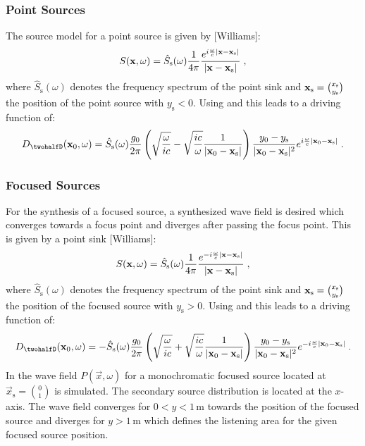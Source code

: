 \documentclass{article}
\begin{document}
\subsubsection{Point Sources}
The source model for a point source is given by [Williams]:
\begin{equation} 
    S(  \mathbf{x}  ,\omega) = 
    \hat{S}_\text{s}(\omega)
    \frac{1}{4\pi} \frac{e^{i\frac{\omega}{c}|  \mathbf{x}  -  \mathbf{x}  _\text{s}|}}{|  \mathbf{x}  -  \mathbf{x}  _\text{s}|}
    \;, 
\end{equation}
where $\hat{S}_\text{s}(\omega)$ denotes the frequency spectrum of the point
sink and $  \mathbf{x}  _\text{s} = \binom{x_\text{s}}{y_\text{s}}$ the position of the
point source with $y_\text{s} < 0$.
Using  and  this leads to a driving function of:
\begin{equation}
    D_\twohalfD(\x_0,\omega) = \hat{S}_\text{s}(\omega)
    \frac{g_0}{2\pi}
    \left( \sqrt{\frac{\omega}{ic}} - \sqrt{\frac{ic}{\omega}} 
    \frac{1}{|\x_0-\x_\text{s}|} \right)
    \frac{y_0-y_\text{s}}{|\x_0-\x_\text{s}|^{2}} 
    e^{i\omegac|\x_0-\x_\text{s}|}
    \qp
    \label{eq:Dps}
\end{equation}



\subsubsection{Focused Sources}

For the synthesis of a focused source, a synthesized wave field is desired which
converges towards a focus point and diverges after passing the focus point.
This is given by a point sink [Williams]:
\begin{equation} 
    S(  \mathbf{x}  ,\omega) = 
    \hat{S}_\text{s}(\omega)
    \frac{1}{4\pi} \frac{e^{-i\frac{\omega}{c}|  \mathbf{x}  -  \mathbf{x}  _\text{s}|}}{|  \mathbf{x}  -  \mathbf{x}  _\text{s}|}
    \;, 
\end{equation}
where $\hat{S}_\text{s}(\omega)$ denotes the frequency spectrum of the point
sink and $  \mathbf{x}  _\text{s} = \binom{x_\text{s}}{y_\text{s}}$ the position of the
focused source with $y_\text{s} > 0$.
Using  and  this leads to a driving function of:
\begin{equation}
    D_\twohalfD(\x_0,\omega) = -\hat{S}_\text{s}(\omega)
    \frac{g_0}{2\pi}
    \left( \sqrt{\frac{\omega}{ic}} + \sqrt{\frac{ic}{\omega}} 
    \frac{1}{|\x_0-\x_\text{s}|} \right)
    \frac{y_0-y_\text{s}}{|\x_0-\x_\text{s}|^{2}} 
    e^{-i\omegac|\x_0-\x_\text{s}|}
    \qp
    \label{eq:Dfs}
\end{equation}
In  the wave field $P(\vec{x},\omega)$ for
a monochromatic focused
source located at $\vec{x}_\text{s} = \binom{0}{1}$ is simulated. The secondary
source distribution is located at the $x$-axis. The wave field converges for
$0<y<1$\,m towards the position of the focused source and diverges for $y>1$\,m
which defines the listening area for the given focused source position.
\end{document}

